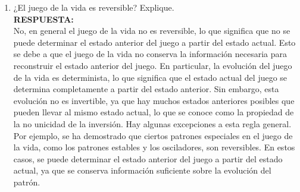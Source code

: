 \documentclass[12pt]{article}
\begin{document}
\begin{enumerate}
    \item ¿El juego de la vida es reversible? Explique.\\
    \textbf{\color{red} RESPUESTA:}\\
    No, en general el juego de la vida no es reversible, lo que significa que no se puede determinar el estado anterior del juego a partir del estado actual. Esto se debe a que el juego de la vida no conserva la información necesaria para reconstruir el estado anterior del juego.
    En particular, la evolución del juego de la vida es determinista, lo que significa que el estado actual del juego se determina completamente a partir del estado anterior. Sin embargo, esta evolución no es invertible, ya que hay muchos estados anteriores posibles que pueden llevar al mismo estado actual, lo que se conoce como la propiedad de la no unicidad de la inversión.
    Hay algunas excepciones a esta regla general. Por ejemplo, se ha demostrado que ciertos patrones especiales en el juego de la vida, como los patrones estables y los osciladores, son reversibles. En estos casos, se puede determinar el estado anterior del juego a partir del estado actual, ya que se conserva información suficiente sobre la evolución del patrón.
\end{enumerate}
\end{document}
